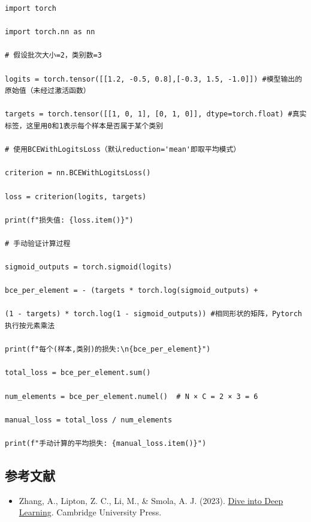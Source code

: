 \begin{verbatim}
import torch

import torch.nn as nn

# 假设批次大小=2，类别数=3

logits = torch.tensor([[1.2, -0.5, 0.8],[-0.3, 1.5, -1.0]]) #模型输出的原始值（未经过激活函数）

targets = torch.tensor([[1, 0, 1], [0, 1, 0]], dtype=torch.float) #真实标签，这里用0和1表示每个样本是否属于某个类别

# 使用BCEWithLogitsLoss（默认reduction='mean'即取平均模式）

criterion = nn.BCEWithLogitsLoss()

loss = criterion(logits, targets)

print(f"损失值: {loss.item()}")

# 手动验证计算过程

sigmoid_outputs = torch.sigmoid(logits)

bce_per_element = - (targets * torch.log(sigmoid_outputs) +

(1 - targets) * torch.log(1 - sigmoid_outputs)) #相同形状的矩阵，Pytorch执行按元素乘法

print(f"每个(样本,类别)的损失:\n{bce_per_element}")

total_loss = bce_per_element.sum()

num_elements = bce_per_element.numel()  # N × C = 2 × 3 = 6

manual_loss = total_loss / num_elements

print(f"手动计算的平均损失: {manual_loss.item()}")
\end{verbatim}

\FloatBarrier
{}
\hypertarget{ux53c2ux8003ux6587ux732e-4}{%
\subsection{参考文献}\label{ux53c2ux8003ux6587ux732e-4}}

\vspace{0.25em}
\begin{itemize}
\tightlist
\item
  Zhang, A., Lipton, Z. C., Li, M., \& Smola, A. J. (2023). \href{https://D2L.ai}{Dive into Deep Learning}. Cambridge University Press.
\end{itemize}

\clearpage
